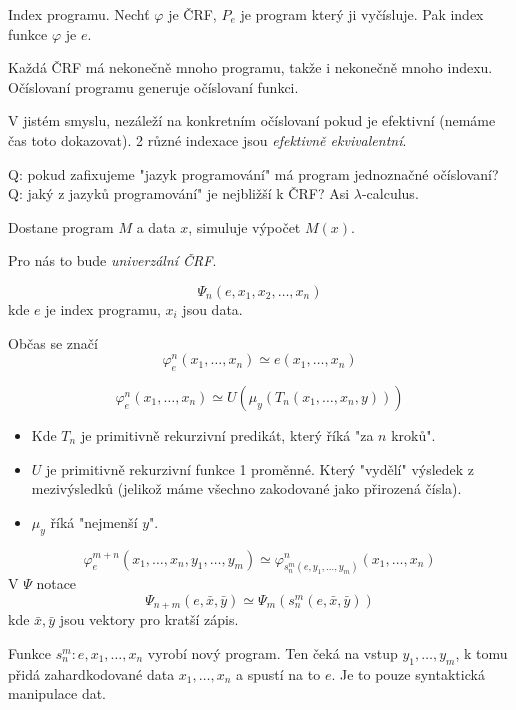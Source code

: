 \begin{definition}
	Index programu.
	Nechť $\varphi$ je ČRF, $P_e$ je program který ji vyčísluje.
	Pak index funkce $\varphi$ je $e$.
\end{definition}

\begin{note}
	Každá ČRF má nekonečně mnoho programu, takže i nekonečně mnoho indexu.
	Očíslovaní programu generuje očíslovaní funkci.

	V jistém smyslu, nezáleží na konkretním očíslovaní pokud je efektivní (nemáme čas toto dokazovat).
	2 různé indexace jsou \emph{efektivně ekvivalentní}.
\end{note}

Q: pokud zafixujeme "jazyk programování" má program jednoznačné očíslovaní?
Q: jaký z jazyků programování" je nejbližší k ČRF? Asi $\lambda$-calculus.

\begin{reminder}[Univerzální TS]
	Dostane program $M$ a data $x$, simuluje výpočet $M(x)$.

	Pro nás to bude \emph{univerzální ČRF}.
\end{reminder}

\begin{definition}
	\[ \Psi_n(e, x_1, x_2, \ldots, x_n) \]
	kde $e$ je index programu, $x_i$ jsou data.

	Občas se značí
	\[ \varphi_e^n(x_1, \ldots, x_n) \simeq {e}(x_1, \ldots, x_n) \]
\end{definition}

\begin{notation}
	\[ \varphi_e^n(x_1, \ldots, x_n) \simeq U(\mu_y(T_n(x_1, \ldots, x_n, y))) \]

	\begin{itemize}
		\item Kde $T_n$ je primitivně rekurzivní predikát, který říká "za $n$ kroků".
		\item $U$ je primitivně rekurzivní funkce 1 proměnné.
			Který "vydělí" výsledek z mezivýsledků (jelikož máme všechno zakodované jako přirozená čísla).
		\item $\mu_y$ říká "nejmenší $y$".
	\end{itemize}
\end{notation}

\begin{theorem}[s-m-n (BD)]\label{s_m_n}
	\[ \varphi_e^{m + n}(x_1, \ldots, x_n, y_1, \ldots, y_m) \simeq \varphi_{s_n^m(e, y_1, \ldots, y_m)}^n(x_1, \ldots, x_n) \]
	V $\Psi$ notace
	\[ \Psi_{n + m}(e, \bar{x}, \bar{y}) \simeq \Psi_m(s_n^m(e, \bar{x}, \bar{y})) \]
	kde $\bar{x}, \bar{y}$ jsou vektory pro kratší zápis.

	Funkce $s_n^m: e, x_1, \ldots, x_n$ vyrobí nový program.
	Ten čeká na vstup $y_1, \ldots, y_m$, k tomu přidá zahardkodované data $x_1, \ldots, x_n$ a spustí na to $e$.
	Je to pouze syntaktická manipulace dat.
\end{theorem}

